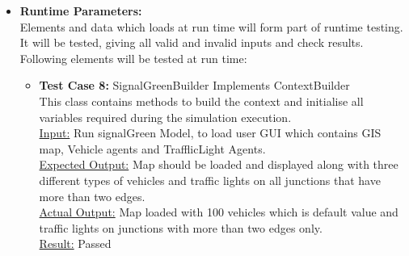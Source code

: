 \documentclass[11pt]{article}
\begin{document}
\begin{enumerate}
\begin{itemize}
\item \textbf{Runtime Parameters:} \hfill \\
Elements and data which loads at run time will form part of runtime testing. It will be tested, giving all valid and invalid inputs and check results. Following elements will be tested at run time:

	\begin{itemize}
		\item \textbf{Test Case 8:} SignalGreenBuilder Implements ContextBuilder\hfill \\
		This class contains methods to build the context and initialise all variables required during the simulation execution.\hfil \\
		\underline{Input:} Run signalGreen Model, to load user GUI which contains GIS map, Vehicle agents and TrafflicLight Agents.\hfill \\
		\underline{Expected Output:} Map should be loaded and displayed along with three different types of vehicles and traffic lights on all junctions that have more than two edges.\hfill \\
		\underline{Actual Output:} Map loaded with 100 vehicles which is default value and traffic lights on junctions with more than two edges only.\hfill \\
		\underline{Result:} Passed
		

\end{itemize}
\end{itemize}
\end{enumerate}
\end{document}
